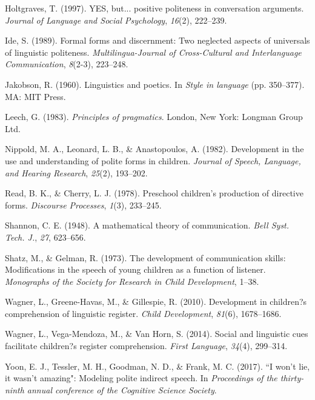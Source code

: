 \documentclass[10pt, letterpaper]{article}
\begin{document}
\hypertarget{ref-holtgraves1997}{}
Holtgraves, T. (1997). YES, but... positive politeness in conversation
arguments. \emph{Journal of Language and Social Psychology},
\emph{16}(2), 222--239.

\hypertarget{ref-ide1989}{}
Ide, S. (1989). Formal forms and discernment: Two neglected aspects of
universals of linguistic politeness. \emph{Multilingua-Journal of
Cross-Cultural and Interlanguage Communication}, \emph{8}(2-3),
223--248.

\hypertarget{ref-jakobson1960}{}
Jakobson, R. (1960). Linguistics and poetics. In \emph{Style in
language} (pp. 350--377). MA: MIT Press.

\hypertarget{ref-leech1983}{}
Leech, G. (1983). \emph{Principles of pragmatics}. London, New York:
Longman Group Ltd.

\hypertarget{ref-nippold1982}{}
Nippold, M. A., Leonard, L. B., \& Anastopoulos, A. (1982). Development
in the use and understanding of polite forms in children. \emph{Journal
of Speech, Language, and Hearing Research}, \emph{25}(2), 193--202.

\hypertarget{ref-read1978}{}
Read, B. K., \& Cherry, L. J. (1978). Preschool children's production of
directive forms. \emph{Discourse Processes}, \emph{1}(3), 233--245.

\hypertarget{ref-shannon1948}{}
Shannon, C. E. (1948). A mathematical theory of communication.
\emph{Bell Syst. Tech. J.}, \emph{27}, 623--656.

\hypertarget{ref-shatz1973}{}
Shatz, M., \& Gelman, R. (1973). The development of communication
skills: Modifications in the speech of young children as a function of
listener. \emph{Monographs of the Society for Research in Child
Development}, 1--38.

\hypertarget{ref-wagner2010}{}
Wagner, L., Greene-Havas, M., \& Gillespie, R. (2010). Development in
children?s comprehension of linguistic register. \emph{Child
Development}, \emph{81}(6), 1678--1686.

\hypertarget{ref-wagner2014}{}
Wagner, L., Vega-Mendoza, M., \& Van Horn, S. (2014). Social and
linguistic cues facilitate children?s register comprehension.
\emph{First Language}, \emph{34}(4), 299--314.

\hypertarget{ref-yoon2017}{}
Yoon, E. J., Tessler, M. H., Goodman, N. D., \& Frank, M. C. (2017). ``I
won't lie, it wasn't amazing": Modeling polite indirect speech. In
\emph{Proceedings of the thirty-ninth annual conference of the Cognitive
Science Society}.
\end{document}
